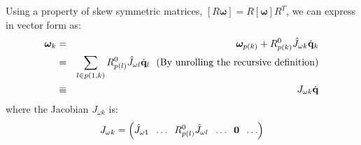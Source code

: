 Using a property of skew symmetric matrices, $[R \bm{\omega}] = R [\bm{\omega}]
R^T$, we can express  in vector form as:
\begin{eqnarray}
\label{eq:angvelk_iterative}
\nonumber
\bm{\omega}_k & = & \bm{\omega}_{p(k)} + R^0_{p(k)} \hat{J}_{\omega k} \dot{\mathbf{q}}_k\\
\nonumber
& = & \sum_{l \in p(1,k)} R^0_{p(l)} \hat{J}_{\omega l} \dot{\mathbf{q}}_l \mbox{\ \ (By unrolling the recursive definition)}\\
& \equiv & J_{\omega k}\dot{\mathbf{q}}
\end{eqnarray}
where the Jacobian $J_{\omega k}$ is:
\begin{equation}
\label{eq:angular_velocity_jac_link}
J_{\omega k} = \left ( \hat{J}_{\omega 1}\;\; \hdots\;\; R^0_{p(l)} \hat{J}_{\omega l} \;\;\hdots\;\; \mathbf{0} \;\;\hdots \right )
\end{equation}

